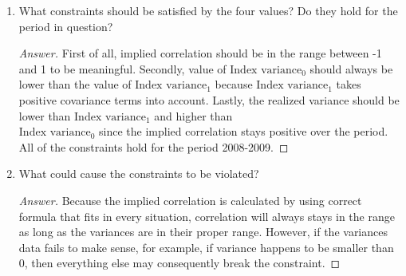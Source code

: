 \documentclass[10pt]{article}
\begin{document}
\begin{enumerate}
\begin{enumerate}
\begin{proof}[Answer]
        The maximum correlation is 0.76 under 1-month window size and 0.70 under 3-month window size. Maximum correlation happens at 2008-11-21 under 1-month window size and 2008-11-20 under 3-month window size. As we can see in the graphs for both window size, implied volatility tends to increase as the variance of index increases. Also, because 3-month correlation incorporates more past movements, as a result, the time series is more smooth compared to 1-month window size where everything is more noisy. However, even though the 3-month model may react to big changes a little slower, both time horizon models generate similar results and show similar relationship with the variances. 
        
   
        \end{proof}        
        
        
        \item What constraints should be satisfied by the four values? Do they hold for the period in question?
        \begin{proof}[Answer]
        First of all, implied correlation should be in the range between -1 and 1 to be meaningful. Secondly, value of $\textrm{Index variance}_0$ should always be lower than the value of $\textrm{Index variance}_1$ because $\textrm{Index variance}_1$ takes positive covariance terms into account. Lastly, the realized variance should be lower than $\textrm{Index variance}_1$ and higher than \\$\textrm{Index variance}_0$ since the implied correlation stays positive over the period. All of the constraints hold for the period 2008-2009.
        
        \end{proof}        
        
        \item What could cause the constraints to be violated?
        \begin{proof}[Answer]
        
        Because the implied correlation is calculated by using correct formula that fits in every situation, correlation will always stays in the range as long as the variances are in their proper range. However, if the variances data fails to make sense, for example, if variance happens to be smaller than 0, then everything else may consequently break the constraint.  
        
        \end{proof}        
    
    \end{enumerate}
    



    

    
    

\end{enumerate}
\end{document}
